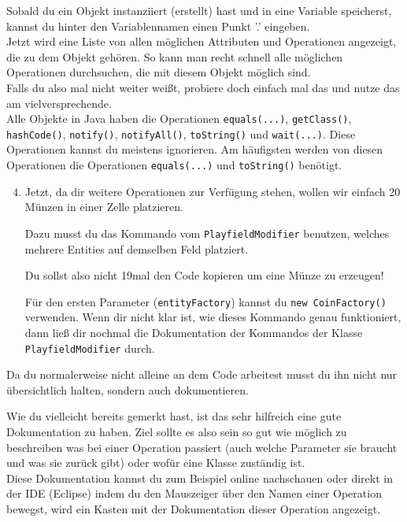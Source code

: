 \begin{Infobox}[Autocompletion]
    Sobald du ein Objekt instanziiert (erstellt) hast und in eine Variable speicherst, kannst du hinter den Variablennamen einen Punkt '.' eingeben.\\
    Jetzt wird eine Liste von allen möglichen Attributen und Operationen angezeigt, die zu dem Objekt gehören. 
    So kann man recht schnell alle möglichen Operationen durchsuchen, die mit diesem Objekt möglich sind.\\
    Falls du also mal nicht weiter weißt, probiere doch einfach mal das und nutze das am vielversprechende.\\

    Alle Objekte in Java haben die Operationen \lstinline{equals(...)}, \lstinline{getClass()}, \lstinline{hashCode()}, \lstinline{notify()}, \lstinline{notifyAll()}, \lstinline{toString()} und \lstinline{wait(...)}.
    Diese Operationen kannst du meistens ignorieren.
    Am häufigsten werden von diesen Operationen die Operationen \lstinline{equals(...)} und \lstinline{toString()} benötigt.
\end{Infobox}

\begin{enumerate} \setcounter{enumi}{3}
    \item Jetzt, da dir weitere Operationen zur Verfügung stehen, wollen wir einfach 20 Münzen in einer Zelle platzieren.

        Dazu musst du das Kommando vom \lstinline{PlayfieldModifier} benutzen, welches mehrere Entities auf demselben Feld platziert.

        Du sollst also nicht 19mal den Code kopieren um eine Münze zu erzeugen!

        Für den ersten Parameter (\lstinline{entityFactory}) kannst du \lstinline{new CoinFactory()} verwenden.
        Wenn dir nicht klar ist, wie dieses Kommando genau funktioniert, dann ließ dir nochmal die Dokumentation der Kommandos der Klasse \lstinline{PlayfieldModifier} durch.
\end{enumerate}

\begin{Infobox}
    Da du normalerweise nicht alleine an dem Code arbeitest musst du ihn nicht nur übersichtlich halten, sondern auch dokumentieren.

    Wie du vielleicht bereits gemerkt hast, ist das sehr hilfreich eine gute Dokumentation zu haben.
    Ziel sollte es also sein so gut wie möglich zu beschreiben was bei einer Operation passiert (auch welche Parameter sie braucht und was sie zurück gibt) oder wofür eine Klasse zuständig ist.\\

    Diese Dokumentation kannst du zum Beispiel online nachschauen oder direkt in der IDE (Eclipse) indem du den Mauszeiger über den Namen einer Operation bewegst, wird ein Kasten mit der Dokumentation dieser Operation angezeigt.
\end{Infobox}


